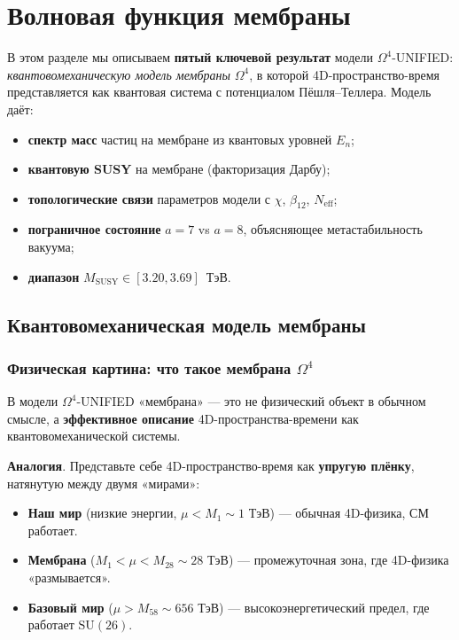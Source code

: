 \documentclass[11pt,a4paper]{article}
\newcommand{\SU}{\ensuremath{\mathrm{SU}}}
\newcommand{\Om}{\ensuremath{\Omega^4}}
\theoremstyle{definition}
\begin{document}
\section{Волновая функция мембраны}
\label{sec:membrane}

В этом разделе мы описываем \textbf{пятый ключевой результат}
модели $\Om$-UNIFIED: \emph{квантовомеханическую модель мембраны}
$\Om$, в которой 4D-пространство-время представляется как
квантовая система с потенциалом Пёшля--Теллера. Модель
даёт:
\begin{itemize}
    \item \textbf{спектр масс} частиц на мембране из квантовых уровней $E_n$;
    \item \textbf{квантовую SUSY} на мембране (факторизация Дарбу);
    \item \textbf{топологические связи} параметров модели с $\chi$, $\beta_{12}$, $N_{\text{eff}}$;
    \item \textbf{пограничное состояние} $a = 7$ vs $a = 8$, объясняющее метастабильность вакуума;
    \item \textbf{диапазон} $M_{\text{SUSY}} \in [3.20, 3.69]$~ТэВ.
\end{itemize}

\subsection{Квантовомеханическая модель мембраны}
\label{subsec:membrane-model}

\subsubsection{Физическая картина: что такое мембрана \texorpdfstring{$\Omega^4$}{Omega4}}
\label{subsubsec:membrane-picture}

В модели $\Om$-UNIFIED «мембрана» — это не физический объект 
в обычном смысле, а \textbf{эффективное описание} 4D-пространства-времени 
как квантовомеханической системы.

\medskip\noindent
\textbf{Аналогия}. Представьте себе 4D-пространство-время как 
\textbf{упругую плёнку}, натянутую между двумя «мирами»:
\begin{itemize}
    \item \textbf{Наш мир} (низкие энергии, $\mu < M_1 \sim 1$ ТэВ) — 
          обычная 4D-физика, СМ работает.
    \item \textbf{Мембрана} ($M_1 < \mu < M_{28} \sim 28$ ТэВ) — 
          промежуточная зона, где 4D-физика «размывается».
    \item \textbf{Базовый мир} ($\mu > M_{58} \sim 656$ ТэВ) — 
          высокоэнергетический предел, где работает $\SU(26)$.
\end{itemize}
\end{document}
